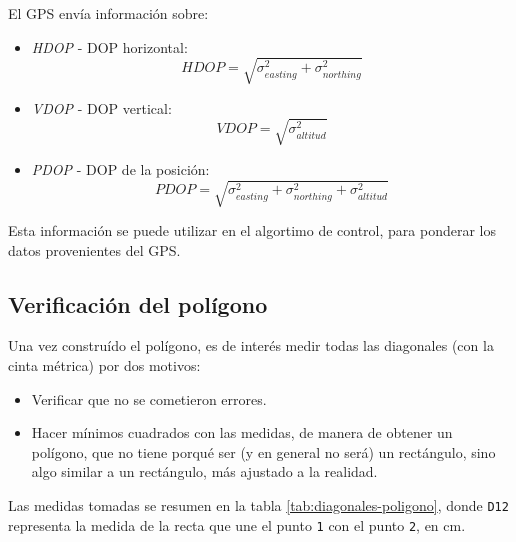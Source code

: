 \documentclass[spanish,12pt,a4paper,titlepage]{report}
\begin{document}
El GPS envía información sobre:
\begin{itemize}
\item \textit{HDOP} - DOP horizontal:
  \begin{equation}
    \label{eq:hdop}
    HDOP = \sqrt{\sigma_{easting}^2+\sigma_{northing}^2}    
  \end{equation}
\item \textit{VDOP} - DOP vertical:
  \begin{equation}
    \label{eq:vdop}
    VDOP = \sqrt{\sigma_{altitud}^2}
  \end{equation}
\item \textit{PDOP} - DOP de la posición:
  \begin{equation}
    \label{eq:pdop}
    PDOP = \sqrt{\sigma_{easting}^2+\sigma_{northing}^2 + \sigma_{altitud}^2}
  \end{equation}
\end{itemize}

Esta información se puede utilizar en el algortimo de control, para ponderar los datos provenientes del GPS.

\newpage
\subsection{Verificación del polígono}
\label{sec:verificacion-del-poligono}

Una vez construído el polígono, es de interés medir todas las diagonales (con la cinta métrica) por dos motivos:
\begin{itemize}
\item Verificar que no se cometieron errores.
\item Hacer mínimos cuadrados con las medidas, de manera de obtener un polígono, que no tiene porqué ser (y en general no será) un rectángulo, sino algo similar a un rectángulo, más ajustado a la realidad.
\end{itemize}

Las medidas tomadas se resumen en la tabla \ref{tab:diagonales-poligono}, donde \verb+D12+ representa la medida de la recta que une el punto \verb+1+ con el punto \verb+2+, en cm.
\end{document}
